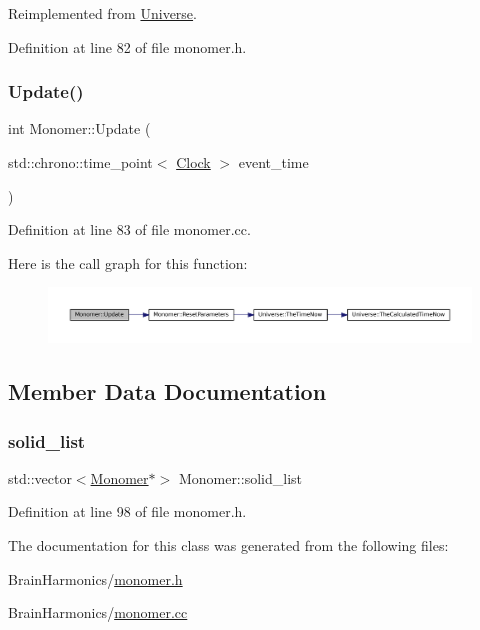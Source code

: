 Reimplemented from \mbox{\hyperlink{class_universe_a2d3d642bfdc863248e93535832fa4b00}{Universe}}.



Definition at line 82 of file monomer.\+h.

\mbox{\label{class_monomer_a48dc2ffb5da8cf3dc3f4f56bba674de6}} 
\subsubsection{\texorpdfstring{Update()}{Update()}}
{\footnotesize\ttfamily int Monomer\+::\+Update (\begin{DoxyParamCaption}\item[{std\+::chrono\+::time\+\_\+point$<$ \mbox{\hyperlink{universe_8h_a0ef8d951d1ca5ab3cfaf7ab4c7a6fd80}{Clock}} $>$}]{event\+\_\+time }\end{DoxyParamCaption})}



Definition at line 83 of file monomer.\+cc.

Here is the call graph for this function\+:\nopagebreak
\begin{figure}[H]
\begin{center}
\leavevmode
\includegraphics[width=350pt]{class_monomer_a48dc2ffb5da8cf3dc3f4f56bba674de6_cgraph}
\end{center}
\end{figure}


\subsection{Member Data Documentation}
\mbox{\label{class_monomer_ad792aeb859c72edbb17414bf00b8fd12}} 
\subsubsection{\texorpdfstring{solid\+\_\+list}{solid\_list}}
{\footnotesize\ttfamily std\+::vector$<$\mbox{\hyperlink{class_monomer}{Monomer}}$\ast$$>$ Monomer\+::solid\+\_\+list\hspace{0.3cm}{\ttfamily [protected]}}



Definition at line 98 of file monomer.\+h.



The documentation for this class was generated from the following files\+:\begin{DoxyCompactItemize}
\item 
Brain\+Harmonics/\mbox{\hyperlink{monomer_8h}{monomer.\+h}}\item 
Brain\+Harmonics/\mbox{\hyperlink{monomer_8cc}{monomer.\+cc}}\end{DoxyCompactItemize}
